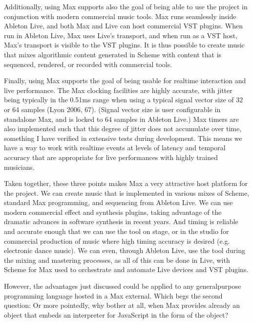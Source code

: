 \documentclass[letterpaper,10pt,english]{sphinxmanual}
\begin{document}
\sphinxAtStartPar
Additionally, using Max supports also the goal of being able to use the project in conjunction with modern commercial music tools.
Max runs seamlessly inside Ableton Live, and both Max and Live can host commercial VST plugins.
When run in Ableton Live, Max uses Live’s transport, and when run as a VST host, Max’s transport is visible to the VST plugins.
It is thus possible to create music that mixes algorithmic content generated in Scheme with
content that is sequenced, rendered, or recorded with commercial tools.

\sphinxAtStartPar
Finally, using Max supports the goal of being usable for real\sphinxhyphen{}time interaction and live performance.
The Max clocking facilities are highly accurate, with jitter being typically in the 0.5\sphinxhyphen{}1ms range when
using a typical signal vector size of 32 or 64 samples (Lyon 2006, 67).
(Signal vector size is user configurable in standalone Max, and is locked to 64 samples in Ableton Live.)
Max timers are also implemented such that this degree of jitter does not accumulate over time, something
I have verified in extensive tests during development.
This means we have a way to work with realtime events at levels of latency and temporal accuracy that
are appropriate for live performances with highly trained musicians.

\sphinxAtStartPar
Taken together, these three points makes Max a very attractive host platform for the project.
We can create music that is implemented in various mixes of Scheme, standard Max programming, and sequencing from Ableton Live.
We can use modern commercial effect and synthesis plugins, taking advantage of the dramatic advances in software synthesis in recent years.
And timing is reliable and accurate enough that we can use the tool on stage, or in the studio for commercial production of
music where high timing accuracy is desired (e.g. electronic dance music).
We can even, through Ableton Live, use the tool during the mixing and mastering processes, as all of this can be done in Live,
with Scheme for Max used to orchestrate and automate Live devices and VST plugins.

\sphinxAtStartPar
However, the advantages just discussed could be applied to any general\sphinxhyphen{}purpose programming
language hosted in a Max external.
Which begs the second question: 
Or more pointedly, why bother at all, when Max provides already an object that embeds an interpreter for JavaScript in the form of
the  object?
\end{document}
